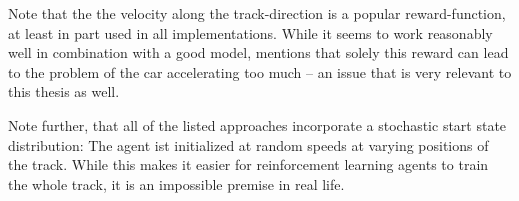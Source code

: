 Note that the the velocity along the track-direction is a popular reward-function, at least in part used in all implementations. While it seems to work reasonably well in combination with a good model, \cite{ben_lau_using_2016} mentions that solely this reward can lead to the problem of the car accelerating too much -- an issue that is very relevant to this thesis as well.

Note further, that all of the listed approaches incorporate a stochastic start state distribution: The agent ist initialized at random speeds at varying positions of the track. While this makes it easier for reinforcement learning agents to train the whole track, it is an impossible premise in real life.